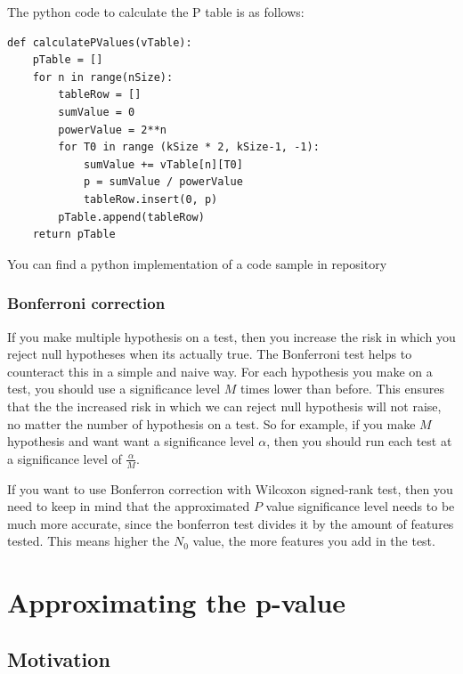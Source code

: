 \documentclass[12pt]{article}
\begin{document}
The python code to calculate the P table is as follows:

\begin{verbatim}
def calculatePValues(vTable):
    pTable = []
    for n in range(nSize):
        tableRow = []
        sumValue = 0
        powerValue = 2**n
        for T0 in range (kSize * 2, kSize-1, -1):
            sumValue += vTable[n][T0]
            p = sumValue / powerValue
            tableRow.insert(0, p)
        pTable.append(tableRow)
    return pTable

\end{verbatim}

You can find a python implementation of a code sample in repository ~\cite{stenver_repo_p_accurate_table_py}

\subsubsection{Bonferroni correction}

If you make multiple hypothesis on a test, then you increase the risk in which you reject null hypotheses when its actually true. The Bonferroni test helps to counteract this in a simple and naive way. For each hypothesis you make on a test, you should use a significance level $M$ times lower than before. This ensures that the the increased risk in which we can reject null hypothesis will not raise, no matter the number of hypothesis on a test. So for example, if you make $M$ hypothesis and want want a significance level $\alpha$,  then you should run each test at a significance level of $\frac{\alpha}{M}$.

If you want to use Bonferron correction with Wilcoxon signed-rank test, then you need to keep in mind that the approximated $P$ value significance level needs to be much more accurate, since the bonferron test divides it by the amount of features tested. This means higher the $N_0$ value, the more features you add in the test.

\newpage

\section{Approximating the p-value}
\label{sec:approximating_p_value}

\subsection{Motivation}
\end{document}
